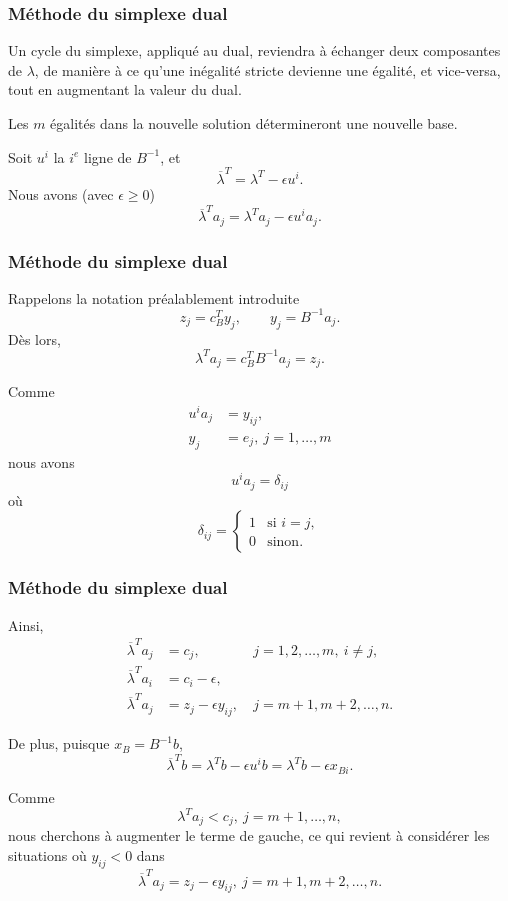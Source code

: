 \documentclass[usepdftitle=false]{beamer}
\begin{document}
\begin{frame}
\frametitle{Méthode du simplexe dual}

Un cycle du simplexe, appliqué au dual, reviendra à échanger deux composantes de $\lambda$, de manière à ce qu'une inégalité stricte devienne une égalité, et vice-versa, tout en augmentant la valeur du dual.

\mbox{}

Les $m$ égalités dans la nouvelle solution détermineront une nouvelle base.

\mbox{}

Soit $u^i$ la $i^e$ ligne de $B^{-1}$, et
\[
\overline{\lambda}^T = \lambda^T - \epsilon u^i.
\]
Nous avons (avec $\epsilon \geq 0$)
\[
\overline{\lambda}^T a_j = \lambda^T a_j - \epsilon u^i a_j.
\]

\end{frame}

\begin{frame}
\frametitle{Méthode du simplexe dual}

Rappelons la notation préalablement introduite
\[
z_j = c_B^T y_j,\qquad y_j = B^{-1}a_j.
\]
Dès lors,
\[
\lambda^T a_j = c_B^T B^{-1} a_j = z_j.
\]

\mbox{}

Comme
\begin{align*}
u^i a_j &= y_{ij},\\
y_j &= e_j,\ j = 1,\ldots,m
\end{align*}
nous avons
\[
u^i a_j = \delta_{ij}
\]
où
\[
\delta_{ij} =
\begin{cases}
1 & \mbox{si } i = j,\\
0 & \mbox{sinon}.
\end{cases}
\]

\end{frame}

\begin{frame}
\frametitle{Méthode du simplexe dual}

Ainsi,
\begin{align*}
\overline{\lambda}^T a_j &= c_j, &\ j = 1,2,\ldots, m,\ i \ne j, \\
\overline{\lambda}^T a_i &= c_i - \epsilon, \\
\overline{\lambda}^T a_j &= z_j - \epsilon y_{ij}, &\ j = m+1,m+2,\ldots, n.
\end{align*}

De plus, puisque $x_B = B^{-1}b$,
\[
\overline{\lambda}^T b = 
\lambda^T b - \epsilon u^i b = 
\lambda^T b - \epsilon x_{Bi}.
\]

\mbox{}

Comme
\[
\lambda^T a_j < c_j,\ j = m+1, \ldots, n,
\]
nous cherchons à augmenter le terme de gauche, ce qui revient à considérer les situations où $y_{ij} < 0$ dans
\[
\overline{\lambda}^T a_j = z_j - \epsilon y_{ij}, \ j = m+1,m+2,\ldots, n.
\]

\end{frame}
\end{document}
